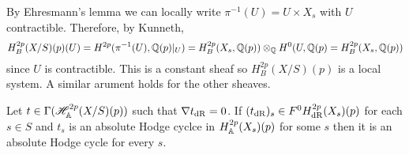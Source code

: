 \documentclass[12pt]{article}
\begin{document}
\begin{remark}
By Ehresmann's lemma we can locally write $\pi^{-1}(U) = U \times X_s$ with $U$ contractible. Therefore, by Kunneth,
\[ H_B^{2p}(X/S)(p)(U) = H^{2 p}(\pi^{-1}(U), \mathbb{Q}(p)|_U) = H^{2p}_B(X_s, \mathbb{Q}(p)) \otimes_{\mathbb{Q}} H^0(U, \mathbb{Q}(p) = H^{2p}_B(X_s, \mathbb{Q}(p)) \]
since $U$ is contractible. This is a constant sheaf so $H^{2p}_B(X/S)(p)$ is a local system. A similar arument holds for the other sheaves.
\end{remark}


\begin{theorem}[Principle B]
Let $t \in \Gamma(\mathscr{H}^{2 p}_{\mathbb{A}}(X/S)(p))$ such that $\nabla t_{\mathrm{dR}} = 0$. If $(t_{\mathrm{dR}})_s \in F^0 H^{2p}_{\mathrm{dR}}(X_s)(p)$ for each $s \in S$ and $t_s$ is an absolute Hodge cyclce in $H^{2p}_{\mathbb{A}}(X_s)(p)$ for some $s$ then it is an absolute Hodge cycle for every $s$.
\end{theorem}
\end{document}
